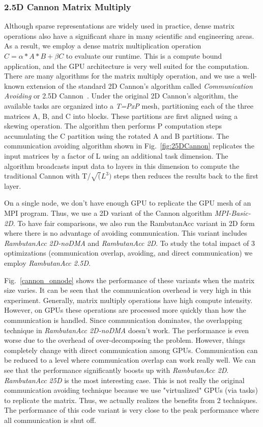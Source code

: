 \subsubsection{2.5D Cannon Matrix Multiply}
Although sparse representations are widely used in practice, dense matrix operations also have a significant share in many scientific and engineering areas.
As a result, we employ a dense matrix multiplication operation $C = \alpha* A * B + \beta C$ to evaluate our runtime.
This is a compute bound application, and the GPU architecture is very well suited for the computation. 
There are many algorithms for the matrix multiply operation, and we use a well-known extension of the standard 2D Cannon's algorithm called {\em Communication Avoiding} or 2.5D Cannon~\cite{25Dcannon}. 
Under the original 2D Cannon's algorithm, the available tasks are organized into a {\em T=PxP} mesh, partitioning each of the three matrices A, B, and C into blocks.
These partitions are first aligned using a skewing operation.
The algorithm then performs P computation steps accumulating the C partition using the rotated A and B partitions.
The communication avoiding algorithm shown in Fig.~\ref{fig:25DCannon} replicates the input matrices by a factor of L using an additional task dimension.
The algorithm broadcasts input data to layers in this dimension to compute the traditional Cannon with T/$\sqrt(L^3)$ steps then reduces the results back to the first layer.

On a single node, we don't have enough GPU to replicate the GPU mesh of an MPI program.
Thus, we use a 2D variant of the Cannon algorithm {\em MPI-Basic-2D}.
To have fair comparisons, we also run the RambutanAcc variant in 2D form where there is no advantage of avoiding communication.
This variant includes {\em RambutanAcc 2D-noDMA} and {\em RambutanAcc 2D}.
To study the total impact of 3 optimizations (communication overlap, avoiding, and direct communication) we employ {\em RambutanAcc 2.5D}.

Fig.~\ref{cannon_onnode} shows the performance of these variants when the matrix size varies.
It can be seen that the communication overhead is very high in this experiment.
Generally, matrix multiply operations have high compute intensity.
However, on GPUs these operations are processed more quickly than how the communication is handled.
Since communication dominates, the overlapping technique in {\em RambutanAcc 2D-noDMA} doesn't work.
The performance is even worse due to the overhead of over-decomposing the problem.
However, things completely change with direct communication among GPUs.
Communication can be reduced to a level where communication overlap can work really well.
We can see that the performance significantly boosts up with {\em RambutanAcc 2D}.
{\em RambutanAcc 25D} is the most interesting case.
This is not really the original communication avoiding technique because we use "virtualized" GPUs (via tasks) to replicate the matrix. 
Thus, we actually realizes the benefits from 2 techniques.
The performance of this code variant is very close to the peak performance where all communication is shut off.



